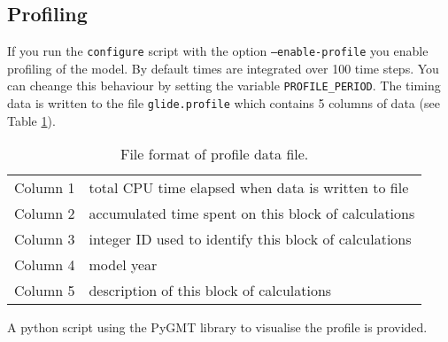 \subsection{Profiling}\label{ug.sec.profile}
If you run the \texttt{configure} script with the option \texttt{--enable-profile} you enable profiling of the model. By default times are integrated over 100 time steps. You can cheange this behaviour by setting the variable \texttt{PROFILE\_PERIOD}. The timing data is written to the file \texttt{glide.profile} which contains 5 columns of data (see Table \ref{ug.tab.profile_format}).
\begin{table}[htbp]
  \centering
  \begin{tabular}{|l|l|}
    \hline
    Column 1 &total CPU time elapsed when data is written to file\\
    Column 2 &accumulated time spent on this block of calculations\\
    Column 3 &integer ID used to identify this block of calculations\\
    Column 4 &model year\\
    Column 5 &description of this block of calculations\\
    \hline
  \end{tabular}
  \caption{File format of profile data file.}
  \label{ug.tab.profile_format}
\end{table}
A python script using the PyGMT library to visualise the profile is provided.

